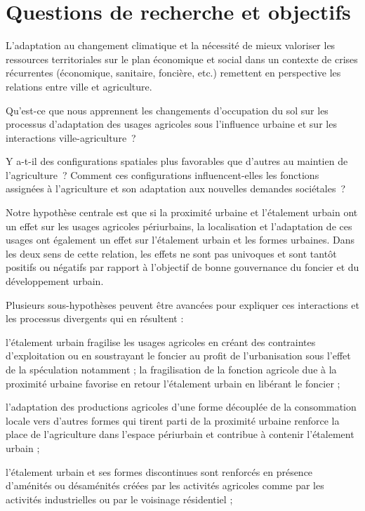 \section{Questions de recherche et objectifs}

L'adaptation au changement climatique et la nécessité
de mieux valoriser les ressources territoriales sur le plan économique
et social dans un contexte de crises récurrentes
(économique, sanitaire, foncière, etc.)
remettent en perspective les relations entre ville et agriculture.

Qu'est-ce que nous apprennent les changements d'occupation du sol
sur les processus d'adaptation des usages agricoles sous l'influence urbaine
et sur les interactions ville-agriculture~?

Y a-t-il des configurations spatiales plus favorables
que d'autres au maintien de l'agriculture~?
Comment ces configurations influencent-elles les fonctions
assignées à l'agriculture et son adaptation aux nouvelles demandes sociétales~?

Notre hypothèse centrale est que si la proximité urbaine
et l'étalement urbain ont un effet sur les usages agricoles
périurbains, la localisation et l'adaptation de ces usages
ont également un effet sur l'étalement urbain et les formes urbaines.
Dans les deux sens de cette relation, les effets ne sont pas univoques
et sont tantôt positifs ou négatifs par rapport à l'objectif de bonne gouvernance
du foncier et du développement urbain.

Plusieurs sous-hypothèses peuvent être avancées
pour expliquer ces interactions et les processus divergents
qui en résultent :

\startitemize

\item l'étalement urbain fragilise les usages agricoles
     en créant des contraintes d'exploitation ou
     en soustrayant le foncier au profit de l'urbanisation
     sous l'effet de la spéculation notamment ;
     la fragilisation de la fonction agricole
     due à la proximité urbaine favorise en retour l'étalement urbain
     en libérant le foncier ;

\item l'adaptation des productions agricoles d'une forme
     découplée de la consommation locale vers d'autres
     formes qui tirent parti de la proximité urbaine
     renforce la place de l'agriculture dans l'espace périurbain
     et contribue à contenir l'étalement urbain ;

\item l'étalement urbain et ses formes discontinues sont renforcés
     en présence d'aménités ou désaménités créées par les activités
     agricoles comme par les activités industrielles
     ou par le voisinage résidentiel ;

